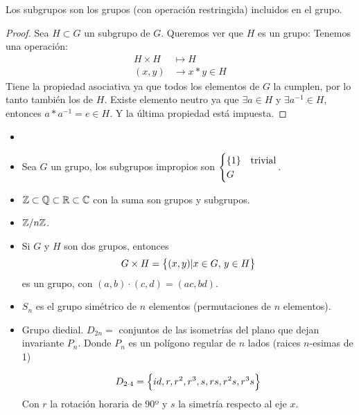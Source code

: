 \begin{obs}
    Los subgrupos son los grupos (con operación restringida) incluidos en el grupo.
\end{obs}
\begin{proof}
    Sea $H \subset G$ un subgrupo de $G$. Queremos ver que $H$ es un grupo:
    Tenemos una operación:
    \[
        \begin{aligned}
            H \times H &\mapsto H \\
            (x, y) &\to x*y \in H
        \end{aligned}
    \]
    Tiene la propiedad asociativa ya que todos los elementos de $G$ la cumplen, por lo tanto también los de $H$.
    Existe elemento neutro ya que $\exists a \in H$ y $\exists a^{-1} \in H$, entonces $a*a^{-1}=e \in H$.
    Y la última propiedad está impuesta.
\end{proof}

\begin{example}
    \begin{itemize}
        \item[]
        \item Sea $G$ un grupo, los subgrupos impropios son
                $\begin{cases}
                    \left\{1\right\} &\text{trivial} \\
                    G &
                \end{cases}$.
        \item $\mathbb{Z} \subset \mathbb{Q} \subset \mathbb{R} \subset \mathbb{C}$ con la suma son grupos y subgrupos.
        \item $\mathbb{Z}/n\mathbb{Z}$.
        \item Si $G$ y $H$ son dos grupos, entonces
            \[
                 G \times H = \left\{(x,y) \vert x \in G, \, y \in H\right\}   
            \]
            es un grupo, con $(a, b) \cdot (c, d) = (ac, bd)$.
        \item $S_n$ es el grupo simétrico de $n$ elementos (permutaciones de $n$ elementos).
        \item Grupo diedial. $D_{2n} =$ conjuntos de las isometrías del plano que dejan invariante $P_n$.
            Donde $P_n$ es un polígono regular de $n$ lados (raices $n$-esimas de 1)

            \[
                D_{2 \cdot 4} = \left\{id, r, r^2, r^3, s, rs, r^2s, r^3s\right\}
            \]
            Con $r$ la rotación horaria de 90º y $s$ la simetría respecto al eje $x$.
    \end{itemize}
\end{example}


